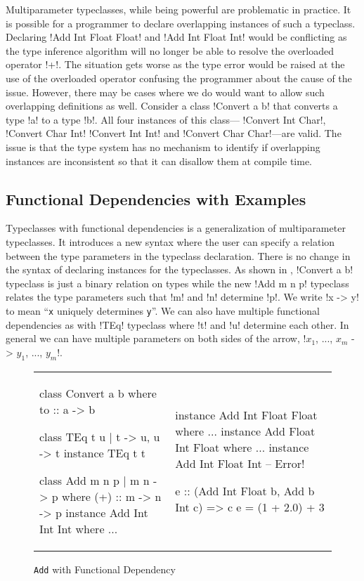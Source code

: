 \documentclass[format=sigplan,manuscript,review,screen,nonacm,margin=1in]{acmart}
\begin{document}
Multiparameter typeclasses, while being powerful are problematic in practice.
It is possible for a programmer to declare overlapping instances of such a typeclass.
Declaring !Add Int Float Float! and !Add Int Float Int!
would be conflicting as the type inference algorithm will no longer be able to resolve
the overloaded operator !+!. The situation gets worse as the type error would be raised
at the use of the overloaded operator confusing the programmer about the
cause of the issue. However, there may be cases where we do would want to allow such overlapping definitions as well.
Consider a class !Convert a b! that converts a type !a! to a type !b!. All four instances of this class---
!Convert Int Char!, !Convert Char Int! !Convert Int Int! and !Convert Char Char!---are valid.
The issue is that the type system has no mechanism to identify if overlapping instances
are inconsistent so that it can disallow them at compile time.

\subsection{Functional Dependencies with Examples}\label{subsec:fd}
Typeclasses with functional dependencies\cite{jones_tcfd_2000} is a generalization of multiparameter typeclasses.
It introduces a new syntax where the user can specify a relation between the type parameters
in the typeclass declaration. There is no change in the syntax of declaring instances for the typeclasses.
As shown in , !Convert a b! typeclass is just a binary relation on types while 
the new !Add m n p! typeclass relates the type parameters such that !m! and !n! determine !p!.
We write !x -> y! to mean ``\texttt{x} uniquely determines \texttt{y}''.
We can also have multiple functional dependencies as with !TEq! typeclass where !t! and !u! determine
each other. In general we can have multiple parameters on both sides of the arrow,
!$x_1$, ..., $x_m$ -> $y_1$, ..., $y_m$!.
\begin{figure}[h t]
  \begin{tabular}{l l}
    \begin{code}
      class Convert a b where
         to :: a -> b

      class TEq t u | t -> u, u -> t
      instance TEq t t
      
      class Add m n p | m n -> p where
        (+) :: m -> n -> p
      instance Add Int Int Int where
         ... 
    \end{code}&%
    \begin{code}
      instance Add Int Float Float where
         ...
      instance Add Float Int Float where
         ...
      instance Add Int Float Int -- Error!

      e :: (Add Int Float b, Add b Int c) => c
      e = (1 + 2.0) + 3
    \end{code}
  \end{tabular}
  \caption{\texttt{Add} with Functional Dependency}
  \label{fig:add-tc-fd}
\end{figure}
\end{document}
